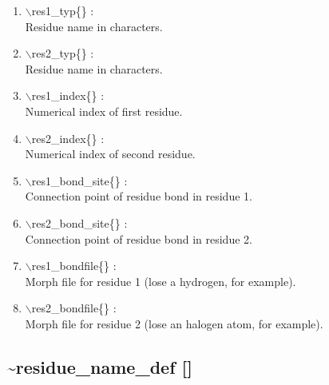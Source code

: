 \documentclass[12pt]{article}
\begin{document}
\begin{enumerate}

 \vspace{0.15in} 
 \item  $\backslash$res1\_typ\{\} : \\ 
    Residue name in characters.

 \vspace{0.15in} 
 \item  $\backslash$res2\_typ\{\} : \\ 
    Residue name in characters.

 \vspace{0.15in} 
 \item  $\backslash$res1\_index\{\} : \\ 
    Numerical index of first residue.

 \vspace{0.15in} 
 \item  $\backslash$res2\_index\{\} : \\ 
    Numerical index of second residue.

 \vspace{0.15in} 
 \item  $\backslash$res1\_bond\_site\{\} : \\ 
   Connection point of residue bond in residue 1.

 \vspace{0.15in} 
 \item  $\backslash$res2\_bond\_site\{\} : \\ 
   Connection point of residue bond in residue 2.

 \vspace{0.15in} 
 \item  $\backslash$res1\_bondfile\{\} : \\ 
   Morph file for residue 1 (lose a hydrogen, for example).

 \vspace{0.15in} 
 \item  $\backslash$res2\_bondfile\{\} : \\ 
   Morph file for residue 2 (lose an halogen atom, for example).
  
\end{enumerate}

\newpage
\subsection*{\bf \~{ }residue\_name\_def []}
\end{document}
